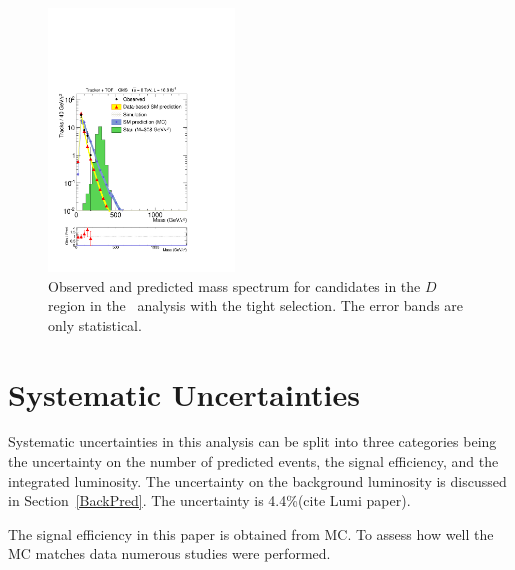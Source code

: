 \begin{figure}
 \begin{center}
  \includegraphics[clip=true, trim=0.0cm 0cm 2.8cm 0cm,width=0.44\textwidth]{figures/tkmu/Rescale_Mass_8TeV_Tight}
 \end{center}
 \caption{Observed and predicted mass spectrum for candidates in the $D$ region in the \tktof\ analysis with the tight selection.
The error bands are only statistical.
\label{fig:TightMassDistribution}}
\end{figure}

\section{Systematic Uncertainties \label{sec:SystUnc}}
Systematic uncertainties in this analysis can be split into three categories being the uncertainty on the number of predicted events, the signal efficiency, and the
integrated luminosity. The uncertainty on the background luminosity is discussed in Section~\ref{BackPred}. The uncertainty is 4.4\%(cite Lumi paper). 

The signal efficiency in this paper is obtained from MC. To assess how well the MC matches data numerous studies were performed.

